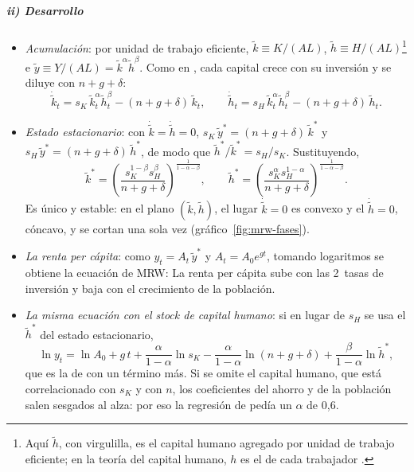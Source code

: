 \documentclass[11pt]{article}
\begin{document}
\subparagraph{ii) Desarrollo}

\begin{itemize}
\item \emph{Acumulación}: por unidad de trabajo eficiente, $\tilde k\equiv K/(AL)$, $\tilde h\equiv H/(AL)$\footnote{Aquí $\tilde h$, con virgulilla, es el capital humano agregado por unidad de trabajo eficiente; en la teoría del capital humano, $h$ es el de cada trabajador .} e $\tilde y\equiv Y/(AL)=\tilde k^{\alpha}\tilde h^{\beta}$. Como en , cada capital crece con su inversión y se diluye con $n+g+\delta$:
  \begin{equation}
  \dot{\tilde k}_t=s_K\,\tilde k_t^{\alpha}\tilde h_t^{\beta}-(n+g+\delta)\,\tilde k_t,\qquad \dot{\tilde h}_t=s_H\,\tilde k_t^{\alpha}\tilde h_t^{\beta}-(n+g+\delta)\,\tilde h_t.\label{eq:mrw-acumulacion}
  \end{equation}
\item \emph{Estado estacionario}: con $\dot{\tilde k}=\dot{\tilde h}=0$, $s_K\,\tilde y^*=(n+g+\delta)\,\tilde k^*$ y $s_H\,\tilde y^*=(n+g+\delta)\,\tilde h^*$, de modo que $\tilde h^*/\tilde k^*=s_H/s_K$. Sustituyendo,
  \[\tilde k^*=\left(\frac{s_K^{1-\beta}s_H^{\beta}}{n+g+\delta}\right)^{\frac{1}{1-\alpha-\beta}},\qquad \tilde h^*=\left(\frac{s_K^{\alpha}s_H^{1-\alpha}}{n+g+\delta}\right)^{\frac{1}{1-\alpha-\beta}}.\]
  Es único y estable: en el plano $(\tilde k,\tilde h)$, el lugar $\dot{\tilde k}=0$ es convexo y el $\dot{\tilde h}=0$, cóncavo, y se cortan una sola vez (gráfico~\ref{fig:mrw-fases}).
\item \emph{La renta per cápita}: como $y_t=A_t\,\tilde y^*$ y $A_t=A_0e^{gt}$, tomando logaritmos se obtiene la ecuación de MRW:
  La renta per cápita sube con las 2~tasas de inversión y baja con el crecimiento de la población.
\item \emph{La misma ecuación con el stock de capital humano}: si en lugar de $s_H$ se usa el $\tilde h^*$ del estado estacionario,
  \[\ln y_t=\ln A_0+g\,t+\frac{\alpha}{1-\alpha}\ln s_K-\frac{\alpha}{1-\alpha}\ln(n+g+\delta)+\frac{\beta}{1-\alpha}\ln\tilde h^*,\]
  que es la de  con un término más. Si se omite el capital humano, que está correlacionado con $s_K$ y con $n$, los coeficientes del ahorro y de la población salen sesgados al alza: por eso la regresión de  pedía un $\alpha$ de 0,6.
\end{itemize}
\end{document}
